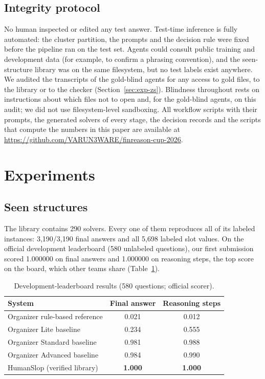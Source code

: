 \documentclass[conference]{IEEEtran}
\newcommand{\repourl}{\url{https://github.com/VARUN3WARE/finreason-cup-2026}}
\begin{document}
\subsection{Integrity protocol}
No human inspected or edited any test answer. Test-time inference is fully automated: the cluster partition, the
prompts and the decision rule were fixed before the pipeline ran on the test set. Agents could consult public
training and development data (for example, to confirm a phrasing convention), and the seen-structure library was on the
same filesystem, but no test labels exist anywhere.
We audited the transcripts of the gold-blind agents for any access to gold files, to the library or to the checker
(Section~\ref{sec:exp-zs}). Blindness throughout rests on instructions about which files not to open and, for the
gold-blind agents, on this audit; we did not use filesystem-level sandboxing. All workflow scripts with their prompts,
the generated solvers of every stage, the decision records and the scripts that compute the numbers in this paper are
available at \repourl.

\section{Experiments}\label{sec:exp}
\subsection{Seen structures}
The library contains 290 solvers. Every one of them reproduces all of its labeled instances: 3{,}190/3{,}190 final
answers and all 5{,}698 labeled slot values. On the official development leaderboard (580 unlabeled questions), our
first submission scored 1.000000 on final answers and 1.000000 on reasoning steps, the top score on the board, which
other teams share (Table~\ref{tab:dev}).

\begin{table}[t]
\centering
\caption{Development-leaderboard results (580 questions; official scorer).}
\label{tab:dev}
\begin{tabular}{lcc}
\toprule
System & Final answer & Reasoning steps \\
\midrule
Organizer rule-based reference & 0.021 & 0.012 \\
Organizer Lite baseline & 0.234 & 0.555 \\
Organizer Standard baseline & 0.981 & 0.988 \\
Organizer Advanced baseline & 0.984 & 0.990 \\
\midrule
HumanSlop (verified library) & \textbf{1.000} & \textbf{1.000} \\
\bottomrule
\end{tabular}
\end{table}
\end{document}
